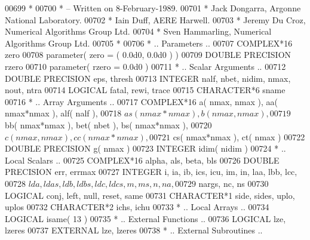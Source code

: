 \begin{DoxyCode}
00699 \textcolor{comment}{*}
00700 \textcolor{comment}{*  -- Written on 8-February-1989.}
00701 \textcolor{comment}{*     Jack Dongarra, Argonne National Laboratory.}
00702 \textcolor{comment}{*     Iain Duff, AERE Harwell.}
00703 \textcolor{comment}{*     Jeremy Du Croz, Numerical Algorithms Group Ltd.}
00704 \textcolor{comment}{*     Sven Hammarling, Numerical Algorithms Group Ltd.}
00705 \textcolor{comment}{*}
00706 \textcolor{comment}{*     .. Parameters ..}
00707       \textcolor{keywordtype}{COMPLEX*16}         zero
00708       parameter( zero = ( 0.0d0, 0.0d0 ) )
00709       \textcolor{keywordtype}{DOUBLE PRECISION}   rzero
00710       parameter( rzero = 0.0d0 )
00711 \textcolor{comment}{*     .. Scalar Arguments ..}
00712       \textcolor{keywordtype}{DOUBLE PRECISION}   eps, thresh
00713       \textcolor{keywordtype}{INTEGER}            nalf, nbet, nidim, nmax, nout, ntra
00714       \textcolor{keywordtype}{LOGICAL}            fatal, rewi, trace
00715       \textcolor{keywordtype}{CHARACTER*6}        sname
00716 \textcolor{comment}{*     .. Array Arguments ..}
00717       \textcolor{keywordtype}{COMPLEX*16}         a( nmax, nmax ), aa( nmax*nmax ), alf( nalf ),
00718      $                   as( nmax*nmax ), b( nmax, nmax ),
00719      $                   bb( nmax*nmax ), bet( nbet ), bs( nmax*nmax ),
00720      $                   c( nmax, nmax ), cc( nmax*nmax ),
00721      $                   cs( nmax*nmax ), ct( nmax )
00722       \textcolor{keywordtype}{DOUBLE PRECISION}   g( nmax )
00723       \textcolor{keywordtype}{INTEGER}            idim( nidim )
00724 \textcolor{comment}{*     .. Local Scalars ..}
00725       \textcolor{keywordtype}{COMPLEX*16}         alpha, als, beta, bls
00726       \textcolor{keywordtype}{DOUBLE PRECISION}   err, errmax
00727       \textcolor{keywordtype}{INTEGER}            i, ia, ib, ics, icu, im, in, laa, lbb, lcc,
00728      $                   lda, ldas, ldb, ldbs, ldc, ldcs, m, ms, n, na,
00729      $                   nargs, nc, ns
00730       \textcolor{keywordtype}{LOGICAL}            conj, left, null, reset, same
00731       \textcolor{keywordtype}{CHARACTER*1}        side, sides, uplo, uplos
00732       \textcolor{keywordtype}{CHARACTER*2}        ichs, ichu
00733 \textcolor{comment}{*     .. Local Arrays ..}
00734       \textcolor{keywordtype}{LOGICAL}            isame( 13 )
00735 \textcolor{comment}{*     .. External Functions ..}
00736       \textcolor{keywordtype}{LOGICAL}            lze, lzeres
00737       \textcolor{keywordtype}{EXTERNAL}           lze, lzeres
00738 \textcolor{comment}{*     .. External Subroutines ..}

\end{DoxyCode}
